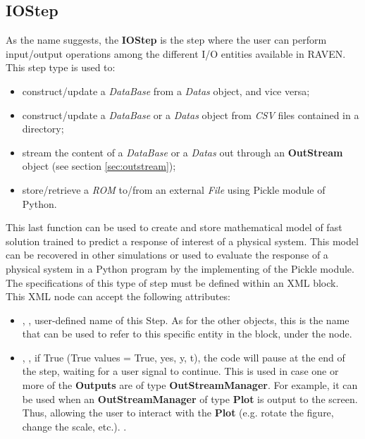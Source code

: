 \subsection{IOStep}
\label{subsec:stepIOStep}
As the name suggests, the \textbf{IOStep} is the step where the user can perform
input/output operations among the different I/O entities available in RAVEN.
%
This step type is used to: 
\begin{itemize}
 \item construct/update a \textit{DataBase} from a \textit{Datas} object, and
   vice versa;
 \item construct/update a \textit{DataBase} or a \textit{Datas} object from
   \textit{CSV} files contained in a directory;
 \item stream the content of a \textit{DataBase} or a \textit{Datas} out through
   an \textbf{OutStream} object (see section \ref{sec:outstream});
\item store/retrieve a \textit{ROM} to/from an external \textit{File} using Pickle module
 of Python.
\end{itemize}
This last function can be used to create and store mathematical model of fast solution
 trained to predict a response of interest of a physical system. This model can be 
recovered in other simulations or used to evaluate the response of a physical system
 in a Python program by the implementing of the Pickle module. 
%
The specifications of this type of step must be defined within an
 XML block.
%
This XML node can accept the following attributes:
\vspace{-5mm}
\begin{itemize}
\itemsep0em
\item {}, , user-defined name of
  this Step.
  \nb As for the other objects, this is the name that can be used to refer to
    this specific entity in the  block, under the 
     node.
\item {}, , if True
  (True values = True, yes, y, t), the code will pause at the end of
  the step, waiting for a user signal to continue. This is used in case one or
  more of the \textbf{Outputs} are of type \textbf{OutStreamManager}.
  For example, it can be used when an \textbf{OutStreamManager} of type
  \textbf{Plot} is output to the screen. Thus, allowing the user to interact
  with the \textbf{Plot} (e.g. rotate the figure, change the scale, etc.).
.
\end{itemize}
